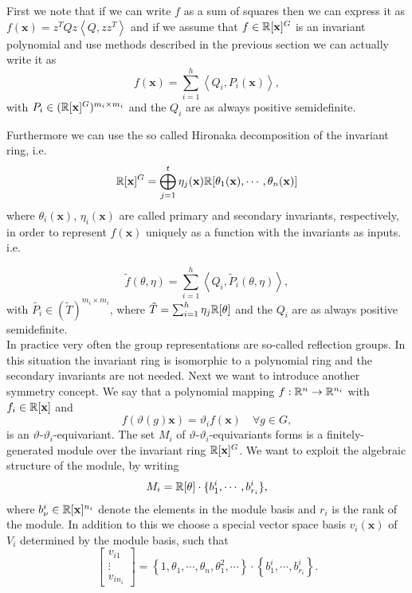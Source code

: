 \documentclass[]{article}
\begin{document}
First we note that if we can write $f$ as a sum of squares then we can express it as $f(\textbf{x}) = z^TQz \left<Q,zz^T\right>$ and if we assume that $f\in \mathbb R[\mathbf{x}]^G$ is an invariant polynomial and use methods described in the previous section we can actually write it as 
\[f(\textbf{x}) = \sum_{i=1}^{h}\left<Q_i,P_i(\mathbf{x})\right>,\]
with $P_i\in (\mathbb R[\mathbf{x}]^G)^{m_i\times m_i}$
and the $Q_i$ are as always positive semidefinite.  

Furthermore we can use the so called Hironaka decomposition of the invariant ring, i.e.
\[\mathbb R[\mathbf{x}]^G = \bigoplus_{j=1}^{t}\eta_j(\textbf{x})\mathbb R[\theta_1(\textbf{x}), \cdots, \theta_n(\mathbf{x})]\] 
where $\theta_i(\mathbf{x})$, $\eta_i(\mathbf{x})$ are called primary and secondary invariants, respectively, in order to represent $f(\mathbf{x})$ uniquely as a function with the invariants as inputs. i.e.

\[\tilde{f}(\theta,\eta) = \sum_{i=1}^{h}\left<Q_i,\tilde{P}_i(\theta,\eta)\right>,\] 
with $\tilde{P_i} \in (\tilde{T})^{m_i\times m_i}$, where $\tilde{T} = \sum_{i=1}^{h}\eta_j\mathbb R[\theta]$ and the $Q_i$ are as always positive semidefinite.\\

In practice very often the group representations are so-called reflection groups. In this situation the invariant ring is 
isomorphic to a polynomial ring and the secondary invariants are not needed. 
Next we want to introduce another symmetry concept. We say that a polynomial mapping $f:\mathbb R^n\rightarrow \mathbb R^{n_i}$ with $f_i\in\mathbb R[\mathbf{x}]$ and 
\[ f(\vartheta(g)\mathbf{x}) =\vartheta_i f(\mathbf{x})\quad \forall g\in G, \]
is an $\vartheta$-$\vartheta_i$-equivariant. The set $M_i$ of $\vartheta$-$\vartheta_i$-equivariants forms is a finitely-generated module over
the invariant ring $\mathbb R[\mathbf{x}]^G$. We want to exploit the algebraic structure of the module, by writing 
\[M_i = \mathbb R[\theta]\cdot\{b_1^i,\cdots,b_{r_i}^i\},\]
where $b_{\nu}^i\in \mathbb R[\mathbf{x}]^{n_i}$ denote the elements in the module basis and $r_i$ is the rank of the module.  In addition to this we choose a special vector space basis $v_i(\mathbf{x})$ of $V_i$ determined by the module basis, such that
\[\begin{bmatrix}v_{i1}\\ \vdots \\ v_{in_i}\end{bmatrix}= \left\{1,\theta_1,\cdots, \theta_n,\theta_1^2,\cdots\right\}\cdot\left\{b_1^i,\cdots,b_{r_i}^i\right\}.\]
\end{document}
